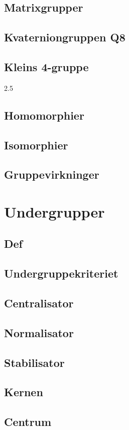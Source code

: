 \documentclass[11pt]{article}
\begin{document}
\subsection*{Matrixgrupper}
\subsection*{Kvaterniongruppen Q8}
\subsection*{Kleins 4-gruppe}
2.5
\subsection*{Homomorphier}
\subsection*{Isomorphier}
\subsection*{Gruppevirkninger}

\section*{Undergrupper}
\subsection*{Def}
\subsection*{Undergruppekriteriet}
\subsection*{Centralisator}
\subsection*{Normalisator}
\subsection*{Stabilisator}
\subsection*{Kernen}
\subsection*{Centrum}
\end{document}
